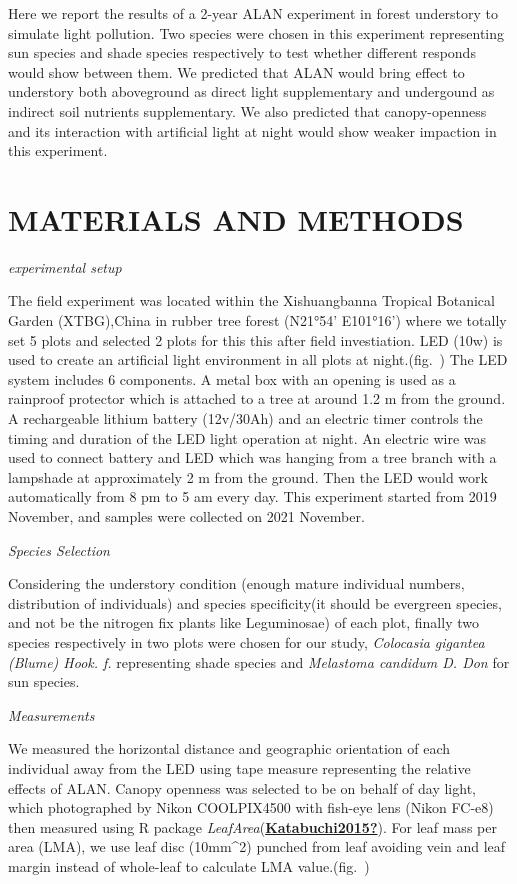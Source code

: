 \documentclass[
]{article}
\begin{document}
Here we report the results of a 2-year ALAN experiment in forest
understory to simulate light pollution. Two species were chosen in this
experiment representing sun species and shade species respectively to
test whether different responds would show between them. We predicted
that ALAN would bring effect to understory both aboveground as direct
light supplementary and undergound as indirect soil nutrients
supplementary. We also predicted that canopy-openness and its
interaction with artificial light at night would show weaker impaction
in this experiment.

\hypertarget{materials-and-methods}{%
\section{MATERIALS AND METHODS}\label{materials-and-methods}}

\emph{experimental setup}

The field experiment was located within the Xishuangbanna Tropical
Botanical Garden (XTBG),China in rubber tree forest (N21°54' E101°16')
where we totally set 5 plots and selected 2 plots for this this after
field investiation. LED (10w) is used to create an artificial light
environment in all plots at night.(fig.~) The LED system includes 6
components. A metal box with an opening is used as a rainproof protector
which is attached to a tree at around 1.2 m from the ground. A
rechargeable lithium battery (12v/30Ah) and an electric timer controls
the timing and duration of the LED light operation at night. An electric
wire was used to connect battery and LED which was hanging from a tree
branch with a lampshade at approximately 2 m from the ground. Then the
LED would work automatically from 8 pm to 5 am every day. This
experiment started from 2019 November, and samples were collected on
2021 November.

\emph{Species Selection}

Considering the understory condition (enough mature individual numbers,
distribution of individuals) and species specificity(it should be
evergreen species, and not be the nitrogen fix plants like Leguminosae)
of each plot, finally two species respectively in two plots were chosen
for our study, \emph{Colocasia gigantea (Blume) Hook. f.} representing
shade species and \emph{Melastoma candidum D. Don} for sun species.

\emph{Measurements}

We measured the horizontal distance and geographic orientation of each
individual away from the LED using tape measure representing the
relative effects of ALAN. Canopy openness was selected to be on behalf
of day light, which photographed by Nikon COOLPIX4500 with fish-eye lens
(Nikon FC-e8) then measured using R package
\emph{LeafArea}(\protect\hyperlink{ref-Katabuchi2015}{\textbf{Katabuchi2015?}}).
For leaf mass per area (LMA), we use leaf disc (10mm\^{}2) punched from
leaf avoiding vein and leaf margin instead of whole-leaf to calculate
LMA value.(fig.~)
\end{document}
